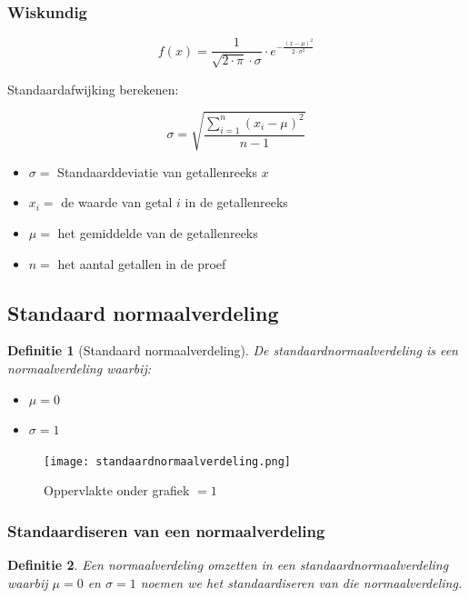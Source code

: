 \documentclass{article}
\newtheorem{theorem}{Definitie}[section]
\begin{document}
\subsubsection{Wiskundig}

\begin{equation}
f(x) = \frac{1}{\sqrt{2\cdot\pi}\cdot \sigma}\cdot e^{-\frac{(x - \mu)^2}{2\cdot\sigma^2}}
\end{equation}

Standaardafwijking berekenen:

\begin{equation}
    \sigma = \sqrt{\frac{\sum_{i=1}^n (x_i - \mu)^2}{n - 1}}
\end{equation}

\begin{itemize}
    \item $\sigma =$ Standaarddeviatie van getallenreeks $x$
    \item $x_i =$ de waarde van getal $i$ in de getallenreeks
    \item $\mu =$ het gemiddelde van de getallenreeks
    \item $n =$ het aantal getallen in de proef
\end{itemize}

\subsection{Standaard normaalverdeling}

\begin{theorem}[Standaard normaalverdeling]
    De standaardnormaalverdeling is een normaalverdeling waarbij:
    
    \begin{itemize}
        \item $\mu = 0$
        \item $\sigma = 1$
    \end{itemize}
\end{theorem}


\begin{figure}[H]
    \centering
    \texttt{[image: standaardnormaalverdeling.png]}
    \caption{Oppervlakte onder grafiek $=1$}
\end{figure}

\subsubsection{Standaardiseren van een normaalverdeling}

\begin{theorem}
    Een normaalverdeling omzetten in een standaardnormaalverdeling waarbij $\mu = 0$ en $\sigma = 1$ noemen we het standaardiseren van die normaalverdeling.
\end{theorem}
\end{document}
